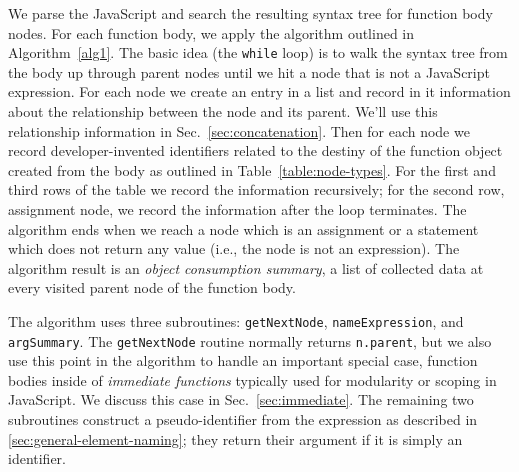 \documentclass[10pt, preprint]{sigplanconf}
\begin{document}
We parse the JavaScript and search the resulting syntax tree for function body nodes. For each function body, we apply the algorithm outlined in Algorithm~\ref{alg1}. The basic idea (the \verb|while| loop) is to walk the syntax tree from the body up through parent nodes until we hit a node that is not a JavaScript expression. For each node we create an entry in a list and record in it information about the relationship between the node and its parent. We'll use this relationship information in Sec.~\ref{sec:concatenation}. Then for each node  we record developer-invented identifiers related to the destiny of the function object created from the body as outlined in  Table~\ref{table:node-types}. For the first and third rows of the table we record the information recursively; for the second row,  assignment node, we record the information after the loop terminates.   The algorithm ends when we reach a node which is an assignment or a statement which does not return any value (i.e., the node is not an expression).  The algorithm result is an \textit{object consumption summary}, a list of collected data at every visited parent node of the function body.

The algorithm uses three subroutines: \verb|getNextNode|,  \verb|nameExpression|, and \verb|argSummary|. The \verb|getNextNode| routine normally returns \verb|n.parent|, but we also use this point in the algorithm to handle an important special case, function bodies inside of \textit{immediate functions} typically used for modularity or scoping in JavaScript. We discuss this case in Sec.~\ref{sec:immediate}. The remaining two subroutines construct a pseudo-identifier from the expression as described in \ref{sec:general-element-naming}; they return their argument if it is simply an identifier.  


\renewcommand{\algorithmicrequire}{\textbf{Input:}}
\renewcommand{\algorithmicensure}{\textbf{Output:}}
\end{document}
